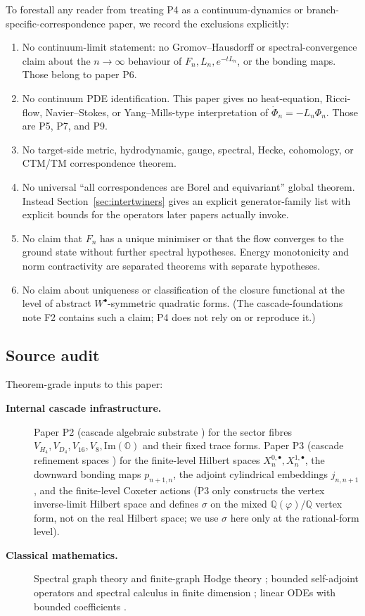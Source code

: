 \documentclass[11pt, a4paper]{amsart}
\theoremstyle{definition}
\newcommand{\Q}{\mathbb{Q}}
\newcommand{\OO}{\mathbb{O}}
\renewcommand{\Im}{\mathrm{Im}}
\begin{document}
To forestall any reader from treating P4 as a continuum-dynamics
or branch-specific-correspondence paper, we record the exclusions
explicitly:

\begin{enumerate}
\item No continuum-limit statement: no Gromov--Hausdorff or
  spectral-convergence claim about the $n \to \infty$ behaviour
  of $F_n, L_n, e^{-tL_n}$, or the bonding maps. Those belong to
  paper P6.
\item No continuum PDE identification. This paper gives no
  heat-equation, Ricci-flow, Navier--Stokes, or Yang--Mills-type
  interpretation of $\dot\Phi_n = -L_n \Phi_n$. Those are P5, P7,
  and P9.
\item No target-side metric, hydrodynamic, gauge, spectral,
  Hecke, cohomology, or CTM/TM correspondence theorem.
\item No universal ``all correspondences are Borel and
  equivariant'' global theorem. Instead
  Section~\ref{sec:intertwiners} gives an explicit generator-family list
  with explicit bounds for the operators later papers actually
  invoke.
\item No claim that $F_n$ has a unique minimiser or that the flow
  converges to the ground state without further spectral
  hypotheses. Energy monotonicity and norm contractivity are
  separated theorems with separate hypotheses.
\item No claim about uniqueness or classification of the closure
  functional at the level of abstract $W^\bullet$-symmetric
  quadratic forms. (The cascade-foundations note F2 contains such
  a claim; P4 does not rely on or reproduce it.)
\end{enumerate}

\subsection{Source audit}

Theorem-grade inputs to this paper:
\begin{description}
\item[\textbf{Internal cascade infrastructure.}]
  Paper P2 (cascade algebraic substrate
  \cite{AlgebraicSubstrate}) for the sector fibres $V_{H_4},
  V_{D_4}, V_{16}, V_8, \Im(\OO)$ and their fixed trace forms.
  Paper P3 (cascade refinement spaces
  \cite{RefinementSpaces}) for the finite-level Hilbert spaces
  $X_n^{0, \bullet}, X_n^{1, \bullet}$, the downward bonding
  maps $p_{n+1, n}$, the adjoint cylindrical embeddings
  $j_{n, n+1}$, and the finite-level Coxeter actions
  (P3 only constructs the vertex inverse-limit Hilbert space and
  defines $\sigma$ on the mixed $\Q(\varphi)/\Q$ vertex form,
  not on the real Hilbert space; we use $\sigma$ here only at
  the rational-form level).
\item[\textbf{Classical mathematics.}]
  Spectral graph theory and finite-graph Hodge theory
  \cite{Chung}; bounded self-adjoint operators and spectral
  calculus in finite dimension \cite{ReedSimonI, HornJohnson};
  linear ODEs with bounded coefficients
  \cite{CoddingtonLevinson, Hartman}.
\end{description}
\end{document}

